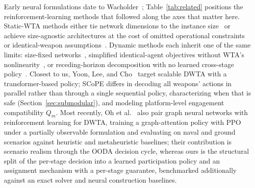 Early neural formulations date to Wacholder~\cite{wacholder1989neural}; Table~\ref{tab:related} positions the reinforcement-learning methods that followed along the axes that matter here. Static-WTA methods either tie network dimensions to the instance size~\cite{meng2021deep,shin2020mean,gaudet2023} or achieve size-agnostic architectures at the cost of omitted operational constraints or identical-weapon assumptions~\cite{luo2021learning,na2023weapon,vinyals2015pointer}. Dynamic methods each inherit one of the same limits: size-fixed networks~\cite{wu2022dynamic}, simplified identical-agent objectives without WTA's nonlinearity~\cite{hu2024}, or receding-horizon decomposition with no learned cross-stage policy~\cite{zhang2020efficient,zhang2020dynamic}. Closest to us, Yoon, Lee, and Cho~\cite{yoontransformer} target scalable DWTA with a transformer-based policy; SCoPE differs in decoding all weapons' actions in parallel rather than through a single sequential policy, characterizing when that is safe (Section~\ref{sec:submodular}), and modeling platform-level engagement compatibility $Q_m$. Most recently, Oh et al.~\cite{oh2026combat} also pair graph neural networks with reinforcement learning for DWTA, training a graph-attention policy with PPO under a partially observable formulation and evaluating on naval and ground scenarios against heuristic and metaheuristic baselines; their contribution is scenario realism through the OODA decision cycle, whereas ours is the structural split of the per-stage decision into a learned participation policy and an assignment mechanism with a per-stage guarantee, benchmarked additionally against an exact solver and neural construction baselines.

